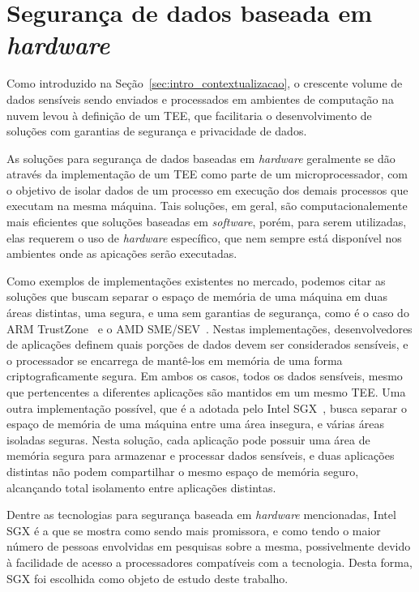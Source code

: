 \section{Segurança de dados baseada em \textit{hardware}}
\label{sec:estadoarte_seg_hard}

Como introduzido na Seção~\ref{sec:intro_contextualizacao}, o crescente volume
de dados sensíveis sendo enviados e processados em ambientes de computação na
nuvem levou à definição de um TEE, que facilitaria o desenvolvimento de soluções
com garantias de segurança e privacidade de dados.

As soluções para segurança de dados baseadas em \textit{hardware} geralmente se
dão através da implementação de um TEE como parte de um microprocessador, com o
objetivo de isolar dados de um processo em execução dos demais processos que
executam na mesma máquina. Tais soluções, em geral, são computacionalemente mais
eficientes que soluções baseadas em \textit{software}, porém, para serem
utilizadas, elas requerem o uso de \textit{hardware} específico, que nem sempre
está disponível nos ambientes onde as apicações serão executadas.

Como exemplos de implementações existentes no mercado, podemos citar as soluções
que buscam separar o espaço de memória de uma máquina em duas áreas distintas,
uma segura, e uma sem garantias de segurança, como é o caso do ARM
TrustZone~\cite{trustzone} e o AMD SME/SEV~\cite{amdSMESEV}. Nestas
implementações, desenvolvedores de aplicações definem quais porções de dados
devem ser considerados sensíveis, e o processador se encarrega de mantê-los em
memória de uma forma criptograficamente segura. Em ambos os casos, todos os
dados sensíveis, mesmo que pertencentes a diferentes aplicações são mantidos em
um mesmo TEE. Uma outra implementação possível, que é a adotada pelo Intel
SGX~\cite{mckeen2013innovative}, busca separar o espaço de memória de uma
máquina entre uma área insegura, e várias áreas isoladas seguras. Nesta solução,
cada aplicação pode possuir uma área de memória segura para armazenar e
processar dados sensíveis, e duas aplicações distintas não podem compartilhar o
mesmo espaço de memória seguro, alcançando total isolamento entre aplicações
distintas.

Dentre as tecnologias para segurança baseada em \textit{hardware} mencionadas,
Intel SGX é a que se mostra como sendo mais promissora, e como tendo o maior
número de pessoas envolvidas em pesquisas sobre a mesma, possivelmente devido
à facilidade de acesso a processadores compatíveis com a tecnologia. Desta
forma, SGX foi escolhida como objeto de estudo deste trabalho.

